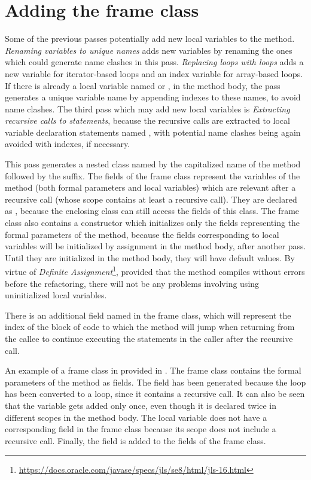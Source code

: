 \section{Adding the frame class}

Some of the previous passes potentially add new local variables to the method. \textit{Renaming variables to unique
names} adds new variables by renaming the ones which could generate name clashes in this pass.
\textit{Replacing  loops with  loops} adds a new  variable for iterator-based
 loops and an index variable  for array-based  loops. If there is already a local
variable named  or , in the method body, the pass generates a unique variable name by appending
indexes to these names, to avoid name clashes. The third pass which may add new local variables is
\textit{Extracting recursive calls to statements}, because the recursive calls are extracted to local variable
declaration statements named , with potential name clashes being again avoided with indexes, if necessary.

This pass generates a  nested class named by the capitalized name of the method followed by the
 suffix. The fields of the frame class represent the variables of the method (both formal parameters and
local variables) which are relevant after a recursive call (whose scope contains at least a recursive call). They are
declared as , because the enclosing class can still access the fields of this class. The frame class also
contains a  constructor which initializes only the fields representing the formal parameters of the
method, because the fields corresponding to local variables will be initialized by assignment in the method body,
after another pass. Until they are initialized in the method body, they will have default values. By virtue of
\textit{Definite Assignment}\footnote{\url{https://docs.oracle.com/javase/specs/jls/se8/html/jls-16.html}}, provided
that the method compiles without errors before the refactoring, there will not be any problems involving using
uninitialized local variables.

There is an additional  field named  in the frame class, which will represent the index of the
block of code to which the method will jump when returning from the callee to continue executing the statements in the
caller after the recursive call.

An example of a frame class in provided in .
The frame class contains the formal parameters of the method as fields. The field  has been generated
because the  loop has been converted to a  loop, since it contains a recursive call. It can also
be seen that the variable  gets added only once, even though it is declared twice in different scopes in the
method body. The local variable  does not have a corresponding field in the frame class because its scope does
not include a recursive call. Finally, the  field is added to the fields of the frame class.

